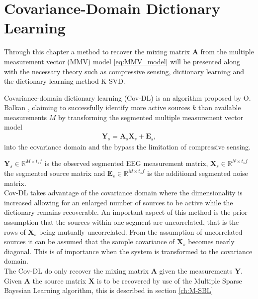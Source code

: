 \chapter{Covariance-Domain Dictionary Learning}\label{ch:Cov-DL}
Through this chapter a method to recover the mixing matrix $\mathbf{A}$ from the multiple measurement vector (MMV) model \eqref{eq:MMV_model} will be presented along with the necessary theory such as compressive sensing, dictionary learning and the dictionary learning method K-SVD. 

Covariance-domain dictionary learning (Cov-DL) is an algorithm proposed by O. Balkan \cite{Balkan2015}, claiming to successfully identify more active sources $k$ than available measurements $M$ by transforming the segmented multiple measurement vector model 
\begin{align*}
\mathbf{Y}_s = \mathbf{A}_s \mathbf{X}_s + \textbf{E}_s,
\end{align*}
into the covariance domain and the bypass the limitation of compressive sensing.



$\mathbf{Y}_s \in \mathbb{R}^{M \times t_s f}$ is the observed segmented EEG measurement matrix, $\mathbf{X}_s \in \mathbb{R}^{N \times t_s f}$ the segmented source matrix and $\mathbf{E}_s \in \mathbb{R}^{M \times t_s f}$ is the additional segmented noise matrix.
\\
Cov-DL takes advantage of the covariance domain where the dimensionality is increased allowing for an enlarged number of sources to be active while the dictionary remains recoverable.  
An important aspect of this method is the prior assumption that the sources within one segment are uncorrelated, that is the rows of $\textbf{X}_s$ being mutually uncorrelated. 
From the assumption of uncorrelated sources it can be assumed that the sample covariance of $\textbf{X}_s$ becomes nearly diagonal. 
This is of importance when the system is transformed to the covariance domain.    
\\
The Cov-DL do only recover the mixing matrix $\mathbf{A}$ given the measurements $\textbf{Y}$. Given $\textbf{A}$ the source matrix $\mathbf{X}$ is to be recovered by use of the Multiple Sparse Bayesian Learning algorithm, this is described in section \ref{ch:M-SBL} 



